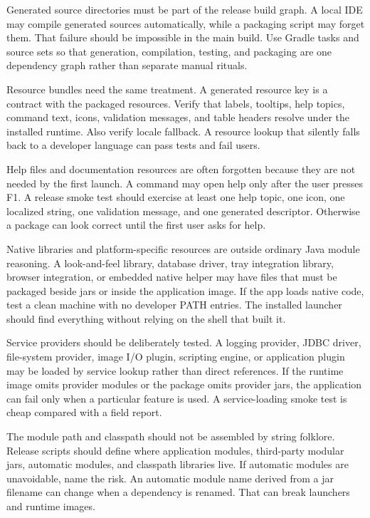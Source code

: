 Generated source directories must be part of the release build graph. A local IDE may compile generated sources automatically, while a packaging script may forget them. That failure should be impossible in the main build. Use Gradle tasks and source sets so that generation, compilation, testing, and packaging are one dependency graph rather than separate manual rituals.

Resource bundles need the same treatment. A generated resource key is a contract with the packaged resources. Verify that labels, tooltips, help topics, command text, icons, validation messages, and table headers resolve under the installed runtime. Also verify locale fallback. A resource lookup that silently falls back to a developer language can pass tests and fail users.

Help files and documentation resources are often forgotten because they are not needed by the first launch. A command may open help only after the user presses F1. A release smoke test should exercise at least one help topic, one icon, one localized string, one validation message, and one generated descriptor. Otherwise a package can look correct until the first user asks for help.

Native libraries and platform-specific resources are outside ordinary Java module reasoning. A look-and-feel library, database driver, tray integration library, browser integration, or embedded native helper may have files that must be packaged beside jars or inside the application image. If the app loads native code, test a clean machine with no developer PATH entries. The installed launcher should find everything without relying on the shell that built it.

Service providers should be deliberately tested. A logging provider, JDBC driver, file-system provider, image I/O plugin, scripting engine, or application plugin may be loaded by service lookup rather than direct references. If the runtime image omits provider modules or the package omits provider jars, the application can fail only when a particular feature is used. A service-loading smoke test is cheap compared with a field report.

The module path and classpath should not be assembled by string folklore. Release scripts should define where application modules, third-party modular jars, automatic modules, and classpath libraries live. If automatic modules are unavoidable, name the risk. An automatic module name derived from a jar filename can change when a dependency is renamed. That can break launchers and runtime images.

